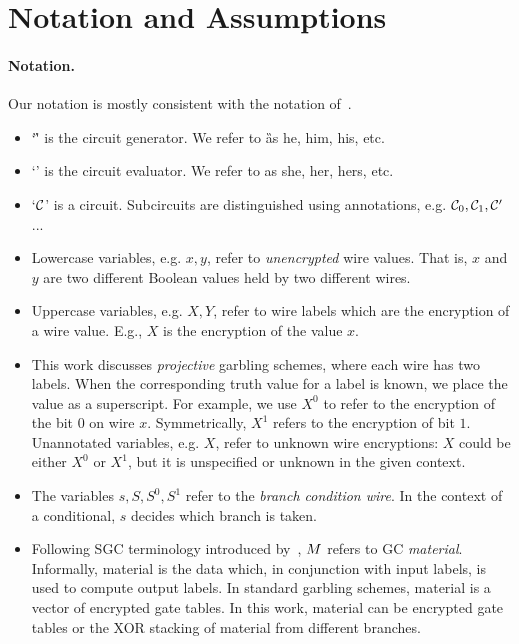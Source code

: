 \section{Notation and Assumptions}\label{sec:notation}

\paragraph{Notation.}

Our notation is mostly consistent with the notation of~\HK.

\begin{itemize}
	\item `\G' is the circuit generator. We refer to \G as
	he, him, his, etc.
	\item `\E' is the circuit evaluator. We refer to \E as
	she, her, hers, etc.
	\item `$\mathcal C$' is a circuit.
	Subcircuits are distinguished using annotations, e.g. $\mathcal C_0, \mathcal C_1, \mathcal C'$...
	\item Lowercase variables, e.g. $x, y$, refer to \emph{unencrypted} wire values.
	That is, $x$ and $y$ are two different Boolean values held by two different wires.
	\item Uppercase variables, e.g. $X, Y$, refer to wire labels which are the encryption of a wire value.
	E.g., $X$ is the encryption of the value $x$.
	\item This work discusses \emph{projective} garbling schemes, where each wire
	has two labels. When the corresponding truth value for a label is known, we place the value as a superscript.
	For example, we use $X^0$ to refer to the encryption of the bit $0$ on wire $x$.
	Symmetrically, $X^1$ refers to the encryption of bit $1$.
	Unannotated variables, e.g. $X$, refer to unknown wire encryptions: $X$ could be
	either $X^0$ or $X^1$, but it is unspecified or unknown in the
	given context.
	\item The variables $s, S, S^0, S^1$ refer to the \emph{branch condition wire}. 
	In the context of a conditional, $s$ decides which branch is taken.
	\item Following SGC terminology introduced by~\cite{AC:Kolesnikov18}, $M$ refers to GC \emph{material}.
	Informally, material is the data which, in conjunction with input labels, is used to compute output labels.
	In standard garbling schemes, material is a vector of encrypted gate tables.
	In this work, material can be encrypted gate tables or the XOR stacking of material from different branches.

\end{itemize}

